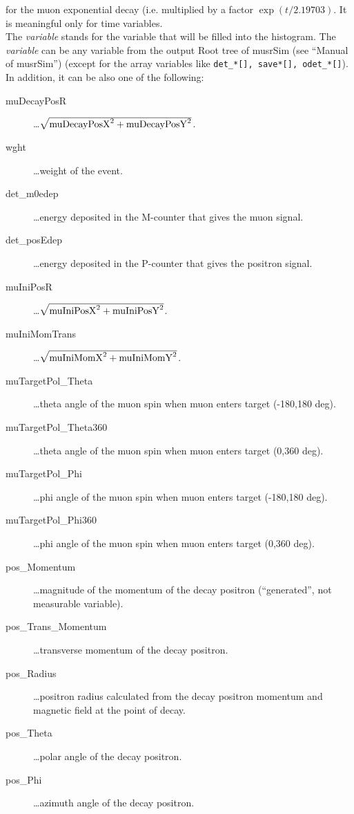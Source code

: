 \documentclass[twoside]{dis04}
\begin{document}
\begin{description}
         for the muon exponential decay (i.e. multiplied by a factor $\exp(t/2.19703)$.  It is meaningful
	 only for time variables.
	 \\
	 The \emph{variable} stands for the variable that will be
	 filled into the histogram.  The \emph{variable} can be any variable from the output Root tree
	 of musrSim (see ``Manual of musrSim'') (except for the array variables like 
	 {\tt det\_*[], save*[], odet\_*[]}). In addition, it can be also one of the following:
	 \begin{description}
	   \item[muDecayPosR]         \ldots $\sqrt{ {\rm muDecayPosX}^2 + {\rm muDecayPosY}^2}$.
	   \item[wght]                \ldots weight of the event.
	   \item[det\_m0edep]         \ldots energy deposited in the M-counter that gives the muon signal.
	   \item[det\_posEdep]        \ldots energy deposited in the P-counter that gives the positron signal.
	   \item[muIniPosR]           \ldots $\sqrt{ {\rm muIniPosX}^2 + {\rm muIniPosY}^2}$.
	   \item[muIniMomTrans]       \ldots $\sqrt{ {\rm muIniMomX}^2 + {\rm muIniMomY}^2}$.
	   \item[muTargetPol\_Theta]   \ldots theta angle of the muon spin when muon enters target (-180,180 deg).
	   \item[muTargetPol\_Theta360]\ldots theta angle of the muon spin when muon enters target (0,360 deg).
	   \item[muTargetPol\_Phi]    \ldots phi angle of the muon spin when muon enters target (-180,180 deg).
	   \item[muTargetPol\_Phi360] \ldots phi angle of the muon spin when muon enters target (0,360 deg).
	   \item[pos\_Momentum]       \ldots magnitude of the momentum of the decay positron (``generated'', not measurable variable).
	   \item[pos\_Trans\_Momentum] \ldots transverse momentum of the decay positron.
	   \item[pos\_Radius]         \ldots positron radius calculated from the decay positron momentum and magnetic 
                                             field at the point of decay.
	   \item[pos\_Theta]          \ldots polar angle of the decay positron.
	   \item[pos\_Phi]            \ldots azimuth angle of the decay positron.

\end{description}
\end{description}
\end{document}
